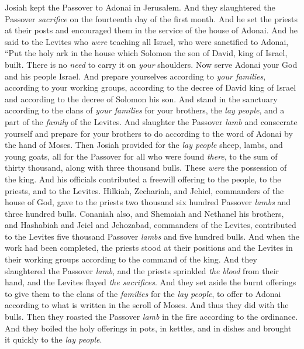 \begin{biblechapter} %
 Josiah kept the Passover to Adonai in Jerusalem. And they slaughtered the Passover \textit{sacrifice} on the fourteenth day of the first month.
\verse And he set the priests at their posts and encouraged them in the service of the house of Adonai.
\verse And he said to the Levites who \textit{were} teaching all Israel, who were sanctified to Adonai, “Put the holy ark in the house which Solomon the son of David, king of Israel, built. There is no \textit{need} to carry it on \textit{your} shoulders. Now serve Adonai your God and his people Israel.
\verse And prepare yourselves according to \textit{your families}, according to your working groups, according to the decree of David king of Israel and according to the decree of Solomon his son.
\verse And stand in the sanctuary according to the clans of \textit{your families} for your brothers, the \textit{lay people}, and a part of the \textit{family} of the Levites.
\verse And slaughter the Passover \textit{lamb} and consecrate yourself and prepare for your brothers to do according to the word of Adonai by the hand of Moses.
\verse Then Josiah provided for the \textit{lay people} sheep, lambs, and young goats, all for the Passover for all who were found \textit{there}, to the sum of thirty thousand, along with three thousand bulls. These \textit{were} the possession of the king.
\verse And his officials contributed a freewill offering to the people, to the priests, and to the Levites. Hilkiah, Zechariah, and Jehiel, commanders of the house of God, gave to the priests two thousand six hundred Passover \textit{lambs} and three hundred bulls.
\verse Conaniah also, and Shemaiah and Nethanel his brothers, and Hashabiah and Jeiel and Jehozabad, commanders of the Levites, contributed to the Levites five thousand Passover \textit{lambs} and five hundred bulls.
\verse And when the work had been completed, the priests stood at their positions and the Levites in their working groups according to the command of the king.
\verse And they slaughtered the Passover \textit{lamb}, and the priests sprinkled \textit{the blood} from their hand, and the Levites flayed \textit{the sacrifices}.
\verse And they set aside the burnt offerings to give them to the clans of the \textit{families} for the \textit{lay people}, to offer to Adonai according to what is written in the scroll of Moses. And thus they did with the bulls.
\verse Then they roasted the Passover \textit{lamb} in the fire according to the ordinance. And they boiled the holy offerings in pots, in kettles, and in dishes and brought it quickly to the \textit{lay people}.

\end{biblechapter}

